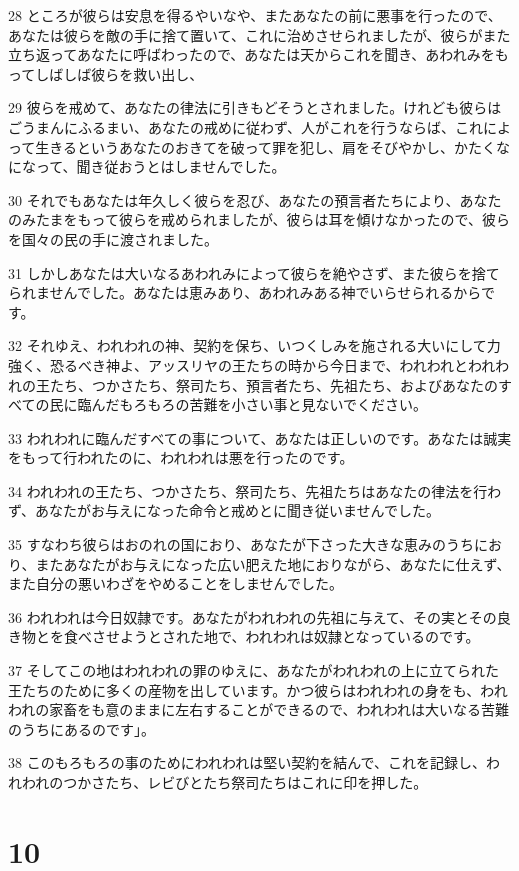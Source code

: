 \par 28 ところが彼らは安息を得るやいなや、またあなたの前に悪事を行ったので、あなたは彼らを敵の手に捨て置いて、これに治めさせられましたが、彼らがまた立ち返ってあなたに呼ばわったので、あなたは天からこれを聞き、あわれみをもってしばしば彼らを救い出し、
\par 29 彼らを戒めて、あなたの律法に引きもどそうとされました。けれども彼らはごうまんにふるまい、あなたの戒めに従わず、人がこれを行うならば、これによって生きるというあなたのおきてを破って罪を犯し、肩をそびやかし、かたくなになって、聞き従おうとはしませんでした。
\par 30 それでもあなたは年久しく彼らを忍び、あなたの預言者たちにより、あなたのみたまをもって彼らを戒められましたが、彼らは耳を傾けなかったので、彼らを国々の民の手に渡されました。
\par 31 しかしあなたは大いなるあわれみによって彼らを絶やさず、また彼らを捨てられませんでした。あなたは恵みあり、あわれみある神でいらせられるからです。
\par 32 それゆえ、われわれの神、契約を保ち、いつくしみを施される大いにして力強く、恐るべき神よ、アッスリヤの王たちの時から今日まで、われわれとわれわれの王たち、つかさたち、祭司たち、預言者たち、先祖たち、およびあなたのすべての民に臨んだもろもろの苦難を小さい事と見ないでください。
\par 33 われわれに臨んだすべての事について、あなたは正しいのです。あなたは誠実をもって行われたのに、われわれは悪を行ったのです。
\par 34 われわれの王たち、つかさたち、祭司たち、先祖たちはあなたの律法を行わず、あなたがお与えになった命令と戒めとに聞き従いませんでした。
\par 35 すなわち彼らはおのれの国におり、あなたが下さった大きな恵みのうちにおり、またあなたがお与えになった広い肥えた地におりながら、あなたに仕えず、また自分の悪いわざをやめることをしませんでした。
\par 36 われわれは今日奴隷です。あなたがわれわれの先祖に与えて、その実とその良き物とを食べさせようとされた地で、われわれは奴隷となっているのです。
\par 37 そしてこの地はわれわれの罪のゆえに、あなたがわれわれの上に立てられた王たちのために多くの産物を出しています。かつ彼らはわれわれの身をも、われわれの家畜をも意のままに左右することができるので、われわれは大いなる苦難のうちにあるのです」。
\par 38 このもろもろの事のためにわれわれは堅い契約を結んで、これを記録し、われわれのつかさたち、レビびとたち祭司たちはこれに印を押した。

\chapter{10}


